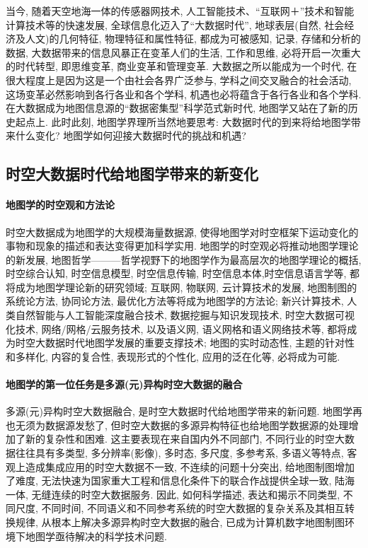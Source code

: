 \documentclass[12pt, a4paper, UTF8]{article}
\begin{document}
当今, 随着天空地海一体的传感器网技术, 人工智能技术、``互联网＋''技术和智能计算技术等的快速发展, 全球信息化迈入了``大数据时代'', 地球表层(自然, 社会经济及人文)的几何特征, 物理特征和属性特征, 都成为可被感知, 记录, 存储和分析的数据, 大数据带来的信息风暴正在变革人们的生活, 工作和思维, 必将开启一次重大的时代转型, 即思维变革, 商业变革和管理变革. 大数据之所以能成为一个时代, 在很大程度上是因为这是一个由社会各界广泛参与, 学科之间交叉融合的社会活动, 这场变革必然影响到各行各业和各个学科, 机遇也必将蕴含于各行各业和各个学科. 在大数据成为地图信息源的“数据密集型”科学范式新时代, 地图学又站在了新的历史起点上. 此时此刻, 地图学界理所当然地要思考: 大数据时代的到来将给地图学带来什么变化? 地图学如何迎接大数据时代的挑战和机遇? 

\subsection{时空大数据时代给地图学带来的新变化}

\paragraph*{地图学的时空观和方法论}

时空大数据成为地图学的大规模海量数据源, 使得地图学对时空框架下运动变化的事物和现象的描述和表达变得更加科学实用. 地图学的时空观必将推动地图学理论的新发展, 地图哲学———哲学视野下的地图学作为最高层次的地图学理论的概括, 时空综合认知, 时空信息模型, 时空信息传输, 时空信息本体,时空信息语言学等, 都将成为地图学理论新的研究领域; 互联网, 物联网, 云计算技术的发展, 地图制图的系统论方法, 协同论方法, 最优化方法等将成为地图学的方法论; 新兴计算技术, 人类自然智能与人工智能深度融合技术, 数据挖掘与知识发现技术, 时空大数据可视化技术, 网络/网格/云服务技术, 以及语义网, 语义网格和语义网络技术等, 都将成为时空大数据时代地图学发展的重要支撑技术; 地图的实时动态性, 主题的针对性和多样化, 内容的复合性, 表现形式的个性化, 应用的泛在化等, 必将成为可能. 

\paragraph*{地图学的第一位任务是多源(元)异构时空大数据的融合}

多源(元)异构时空大数据融合, 是时空大数据时代给地图学带来的新问题. 地图学再也无须为数据源发愁了, 但时空大数据的多源异构特征也给地图学数据源的处理增加了新的复杂性和困难. 这主要表现在来自国内外不同部门, 不同行业的时空大数据往往具有多类型, 多分辨率(影像), 多时态, 多尺度, 多参考系, 多语义等特点, 客观上造成集成应用的时空大数据不一致, 不连续的问题十分突出, 给地图制图增加了难度, 无法快速为国家重大工程和信息化条件下的联合作战提供全球一致, 陆海一体, 无缝连续的时空大数据服务. 因此, 如何科学描述, 表达和揭示不同类型, 不同尺度, 不同时间, 不同语义和不同参考系统的时空大数据的复杂关系及其相互转换规律, 从根本上解决多源异构时空大数据的融合, 已成为计算机数字地图制图环境下地图学亟待解决的科学技术问题.
\end{document}
